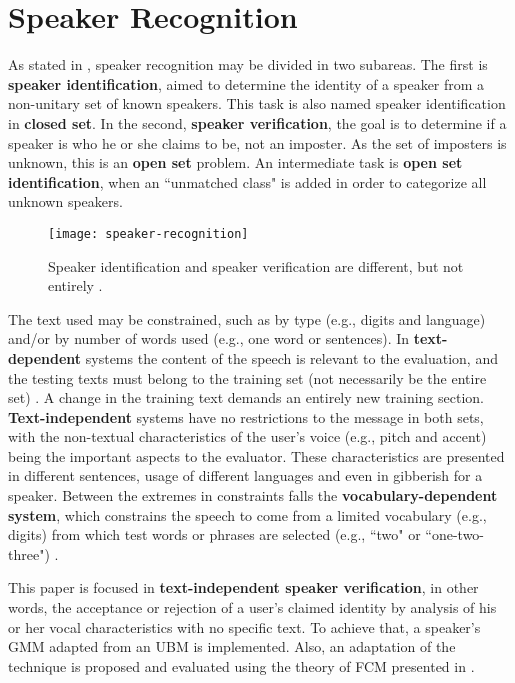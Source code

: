\section{Speaker Recognition}
\label{sec:speaker-recognition}

As stated in \cite{reynolds.campbell.2008}, speaker recognition may be divided in two subareas. The first is \textbf{speaker identification}, aimed to determine the identity of a speaker from a non-unitary set of known speakers. This task is also named speaker identification in \textbf{closed set}. In the second, \textbf{speaker verification}, the goal is to determine if a speaker is who he or she claims to be, not an imposter. As the set of imposters is unknown, this is an \textbf{open set} problem. An intermediate task is \textbf{open set identification}, when an ``unmatched class" is added in order to categorize all unknown speakers.

\begin{figure}[ht]
    \centering
    \texttt{[image: speaker-recognition]}
    \caption{Speaker identification and speaker verification are different, but not entirely \cite{reynolds.1995}.}
    \label{fig:speaker-recognition}
\end{figure}

The text used may be constrained, such as by type (e.g., digits and language) and/or by number of words used (e.g., one word or sentences). In \textbf{text-dependent} systems the content of the speech is relevant to the evaluation, and the testing texts must belong to the training set (not necessarily be the entire set) \cite{hebert.2008}. A change in the training text demands an entirely new training section. \textbf{Text-independent} systems have no restrictions to the message in both sets, with the non-textual characteristics of the user's voice (e.g., pitch and accent) being the important aspects to the evaluator. These characteristics are presented in different sentences, usage of different languages and even in gibberish for a speaker. Between the extremes in constraints falls the \textbf{vocabulary-dependent system}, which constrains the speech to come from a limited vocabulary (e.g., digits) from which test words or phrases are selected (e.g., ``two" or ``one-two-three") \cite{reynolds.1995}.

This paper is focused in \textbf{text-independent speaker verification}, in other words, the acceptance or rejection of a user's claimed identity by analysis of his or her vocal characteristics with no specific text. To achieve that, a speaker's GMM adapted from an UBM \cite{reynolds.quatieri.dunn.2000} is implemented. Also, an adaptation of the technique is proposed and evaluated using the theory of FCM presented in \cite{gao.zhou.pu.2013}.

